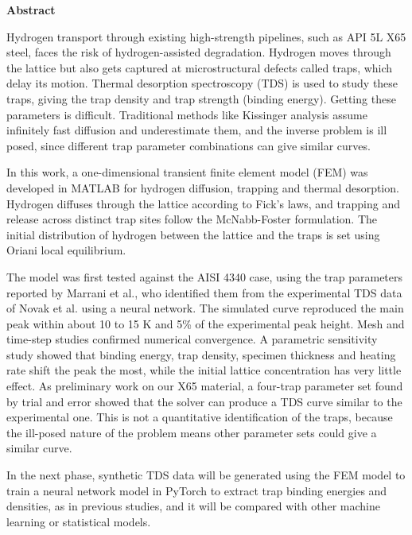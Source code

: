 \documentclass[a4paper,12pt,oneside]{report}
\begin{document}

\newpage

\begin{center}
{\Large\bf Abstract}
\end{center}


Hydrogen transport through existing high-strength pipelines, such as API 5L X65 steel, faces the risk of hydrogen-assisted degradation. Hydrogen moves through the lattice but also gets captured at microstructural defects called traps, which delay its motion. Thermal desorption spectroscopy (TDS) is used to study these traps, giving the trap density and trap strength (binding energy). Getting these parameters is difficult. Traditional methods like Kissinger analysis assume infinitely fast diffusion and underestimate them, and the inverse problem is ill posed, since different trap parameter combinations can give similar curves.

In this work, a one-dimensional transient finite element model (FEM) was developed in MATLAB for hydrogen diffusion, trapping and thermal desorption. Hydrogen diffuses through the lattice according to Fick's laws, and trapping and release across distinct trap sites follow the McNabb-Foster formulation. The initial distribution of hydrogen between the lattice and the traps is set using Oriani local equilibrium.

The model was first tested against the AISI 4340 case, using the trap parameters reported by Marrani et al., who identified them from the experimental TDS data of Novak et al. using a neural network. The simulated curve reproduced the main peak within about 10 to 15 K and 5\% of the experimental peak height. Mesh and time-step studies confirmed numerical convergence. A parametric sensitivity study showed that binding energy, trap density, specimen thickness and heating rate shift the peak the most, while the initial lattice concentration has very little effect. As preliminary work on our X65 material, a four-trap parameter set found by trial and error showed that the solver can produce a TDS curve similar to the experimental one. This is not a quantitative identification of the traps, because the ill-posed nature of the problem means other parameter sets could give a similar curve.

In the next phase, synthetic TDS data will be generated using the FEM model to train a neural network model in PyTorch to extract trap binding energies and densities, as in previous studies, and it will be compared with other machine learning or statistical models.
\end{document}
